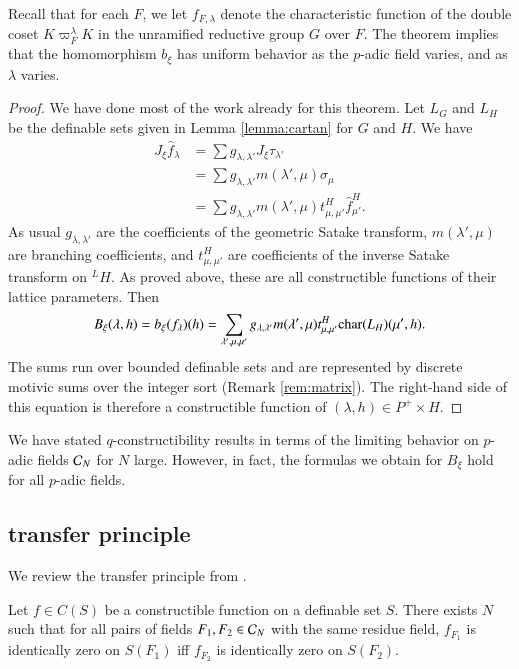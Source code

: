 Recall that for each $F$, we let $f_{F,\lambda}$ denote the
characteristic function of the double coset $K\varpi_F^\lambda K$ in
the unramified reductive group $G$ over $F$.  The theorem implies that
the homomorphism $b_\xi$ has uniform behavior as the $p$-adic field
varies, and as $\lambda$ varies.

\begin{proof}
  We have done most of the work already for this theorem.  Let $L_G$
  and $L_H$ be the definable sets given in Lemma \ref{lemma:cartan}
  for $G$ and $H$.  
   We have
  \begin{align*}
    J_\xi \hat f_\lambda  &= 
\sum  g_{\lambda,\lambda'} J_\xi\tau_{\lambda'}
\\ &=
\sum g_{\lambda,\lambda'} m(\lambda',\mu) \sigma_\mu 
\\ &=
\sum g_{\lambda,\lambda'} m(\lambda',\mu) t^H_{\mu,\mu'} \hat f_{\mu'}^H.           
    \end{align*}
As usual $g_{\lambda,\lambda'}$ are the coefficients of the geometric
Satake
transform, $m(\lambda',\mu)$ are branching coefficients, and
$t^H_{\mu,\mu'}$ are coefficients of the inverse Satake transform on
${}^LH$.  As proved above, these are all constructible functions of
their
lattice parameters.
Then
\[
B_\xi(\lambda,h) = b_\xi(f_\lambda)(h) =
\sum_{\lambda',\mu,\mu'} g_{\lambda,\lambda'} m(\lambda',\mu)
t^H_{\mu,\mu'}
{\operatorname{char}}(L_H)(\mu',h).
\]
The sums run over bounded definable sets and are represented by
discrete motivic sums over the integer sort (Remark \ref{rem:matrix}).  
The right-hand side of
this
equation is therefore a constructible function of $(\lambda,h)\in
P^+\times H$.
\end{proof}

\begin{remark}  
  We have stated $q$-constructibility results in terms of the limiting
  behavior on $p$-adic fields $\mathcal C_N$ for $N$ large.  However, in fact,
  the formulas we obtain for $B_\xi$ hold for all $p$-adic fields.
\end{remark}


\subsection{transfer principle}\label{sec:transfer}

We review the transfer principle from
\cite{cluckers2010constructible}.

\begin{theorem}\label{thm:transfer-principle}
  Let $f\in C(S)$ be a constructible function on a definable set $S$.
  There exists $N$ such that for all pairs of fields $F_1,F_2\in \mathcal C_N$
  with the same residue field, $f_{F_1}$ is identically zero on
  $S(F_1)$ iff $f_{F_2}$ is identically zero on $S(F_2)$.
\end{theorem}

